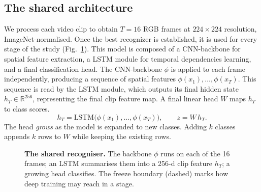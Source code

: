 \documentclass[conference]{IEEEtran}
\begin{document}
\subsection{The shared architecture}
We process each video clip to obtain $T{=}16$ RGB frames
at $224\times224$ resolution, ImageNet-normalised.
Once the best recognizer is established, it is used for every stage of the study (Fig.~\ref{fig:arch}). This model is composed of a CNN-backbone for spatial feature extraction, a LSTM module for temporal dependencies learning, and a final classification head.
The CNN-backbone $\phi$ is applied to each frame
independently, producing a sequence of spatial features $\phi(x_1),\dots,\phi(x_T)$. This sequence is read by the LSTM module, which outputs its final hidden state $h_T\in\mathbb{R}^{256}$, representing the final clip feature map. A final linear
head $W$ maps $h_T$ to class scores.
\begin{equation}
h_T = \mathrm{LSTM}\big(\phi(x_1),\dots,\phi(x_T)\big),\qquad z = W\,h_T .
\end{equation}
The head \emph{grows} as the model is expanded to new classes. Adding $k$ classes appends $k$ rows to $W$ while keeping the existing rows. 

\begin{figure}[t]
\centering
{}
\caption{\textbf{The shared recogniser.} The backbone $\phi$ runs on each of the 16 frames;
an LSTM summarises them into a 256-d clip feature $h_T$; a growing head classifies. The
freeze boundary (dashed) marks how deep training may reach in a stage.}
\label{fig:arch}
\end{figure}
\end{document}
